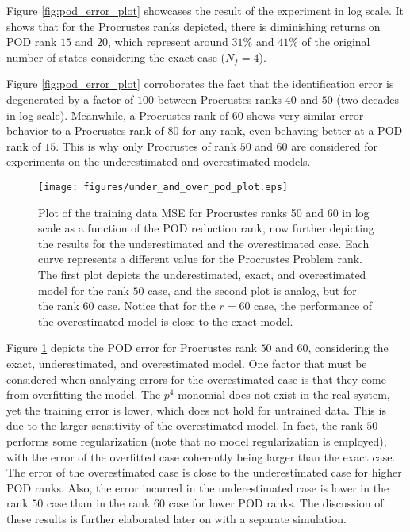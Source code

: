 Figure \ref{fig:pod_error_plot} showcases the result of the experiment in log scale.
%
It shows that for the Procrustes ranks depicted, there is diminishing returns on POD rank $15$ and $20$, which represent around $31\%$ and $41\%$ of the original number of states considering the exact case ($N_f=4$).

Figure \ref{fig:pod_error_plot} corroborates the fact that the identification error is degenerated by a factor of $100$ between Procrustes ranks $40$ and $50$ (two decades in log scale). Meanwhile, a Procrustes rank of $60$ shows very similar error behavior to a Procrustes rank of $80$ for any rank, even behaving better at a POD rank of $15$.
%
This is why only Procrustes of rank $50$ and $60$ are considered for experiments on the underestimated and overestimated models.

\begin{figure}
    \centering
    \texttt{[image: figures/under\_and\_over\_pod\_plot.eps]}
    \caption{Plot of the training data MSE for Procrustes ranks 50 and 60 in log scale as a function of the POD reduction rank, now further depicting the results for the underestimated and the overestimated case. Each curve represents a different value for the Procrustes Problem rank. The first plot depicts the underestimated, exact, and overestimated model for the rank $50$ case, and the second plot is analog, but for the rank $60$ case. Notice that for the $r = 60$ case, the performance of the overestimated model is close to the exact model.}
    \label{fig:pod_error_underandover_plot}
\end{figure}

Figure \ref{fig:pod_error_underandover_plot} depicts the POD error for Procrustes rank $50$ and $60$, considering the exact, underestimated, and overestimated model.
%
One factor that must be considered when analyzing errors for the overestimated case is that they come from overfitting the model.
%
The $p^4$ monomial does not exist in the real system, yet the training error is lower, which does not hold for untrained data.
%
This is due to the larger sensitivity of the overestimated model.
%
In fact, the rank $ 50 $ performs some regularization (note that no model regularization is employed), with the error of the overfitted case coherently being larger than the exact case.
%
The error of the overestimated case is close to the underestimated case for higher POD ranks.
%
Also, the error incurred in the underestimated case is lower in the rank $50$ case than in the rank $60$ case for lower POD ranks.
%
The discussion of these results is further elaborated later on with a separate simulation.



